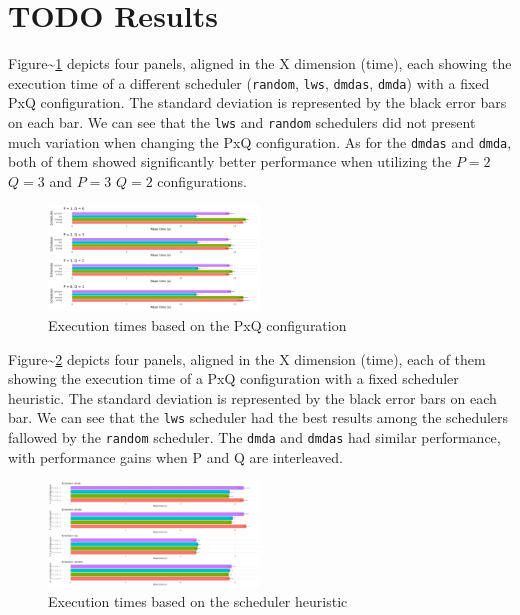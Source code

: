 \documentclass[conference, 10pt, final]{IEEEtran}
\begin{document}
\section{{\bfseries\sffamily TODO} Results}
\label{sec:results}
Figure\textasciitilde{}\ref{fig:timePQ} depicts four panels, aligned in the X dimension (time), each showing the execution time of a different scheduler (\verb|random|, \verb|lws|, \verb|dmdas|, \verb|dmda|) with a fixed PxQ configuration. The standard deviation is represented by the black error bars on each bar. We can see that the \verb|lws| and \verb|random| schedulers did not present much variation when changing the PxQ configuration. As for the \verb|dmdas| and \verb|dmda|, both of them showed significantly better performance when utilizing the \(P=2\) \(Q=3\) and \(P=3\) \(Q=2\) configurations.


\begin{figure}[ht]
\centering
\includegraphics[width=0.5\textwidth]{tempo_medio_com_desvio_padrao_por_PQ.png}
\caption{Execution times based on the PxQ configuration}
\label{fig:timePQ}
\end{figure}

Figure\textasciitilde{}\ref{fig:timeSched} depicts four panels, aligned in the X dimension (time), each of them showing the execution time of a PxQ configuration with a fixed scheduler heuristic. The standard deviation is represented by the black error bars on each bar. We can see that the \verb|lws| scheduler had the best results among the schedulers fallowed by the \verb|random| scheduler. The \verb|dmda| and \verb|dmdas| had similar performance, with performance gains when P and Q are interleaved.

\begin{figure}[ht]
\centering
\includegraphics[width=0.5\textwidth]{tempo_medio_com_desvio_padrao_por_scheduler.png}
\caption{Execution times based on the scheduler heuristic}
\label{fig:timeSched}
\end{figure}
\end{document}
